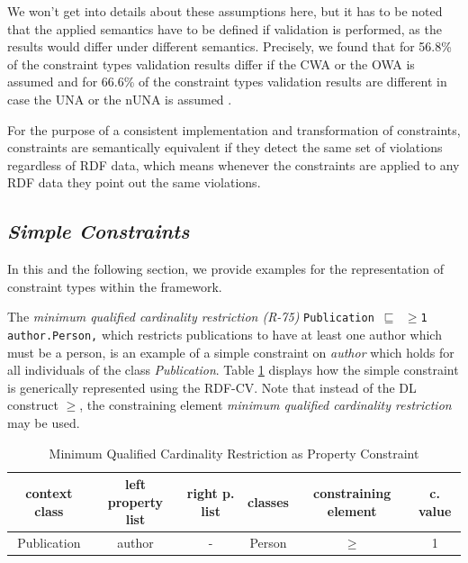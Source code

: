 \documentclass[a4paper,fontsize=11pt]{scrartcl}
\newcommand{\ms}[1]{\texttt{#1}}
\begin{document}
We won't get into details about these assumptions here, but it has to be noted that the applied semantics have to be defined if validation is performed, as the results would differ under different semantics. Precisely, we found that for 56.8\% of the constraint types validation results differ if the CWA or the OWA is assumed 
and for 66.6\% of the constraint types validation results are different in case the UNA or the nUNA is assumed \cite{BoschNolleAcarEckert2015}.

For the purpose of a consistent implementation and transformation of constraints, constraints are semantically equivalent  
if they detect the same set of violations regardless of RDF data, 
which means whenever the constraints are applied to any RDF data they point out the same violations.


\subsection{\emph{Simple Constraints}}
In this and the following section, we provide examples for the representation of constraint types within the framework.

The \emph{minimum qualified cardinality restriction (R-75)} {\small\ms{Publication $\sqsubseteq$ $\geq$1 author.Person,}}
which restricts publications to have at least one author which must be a person,
is an example of a simple constraint on \emph{author}
which holds for all individuals of the class \emph{Publication}.
Table \ref{tab:property-constraint-cardinality-restriction} displays how the simple constraint is generically represented using the RDF-CV. Note that instead of the DL construct $\geq$, the constraining element \emph{minimum qualified cardinality restriction} may be used.

\begin{table}[H]
  \scriptsize
  \sffamily
  \vspace{0cm}
	\caption{Minimum Qualified Cardinality Restriction as Property Constraint}
	\label{tab:property-constraint-cardinality-restriction}
	\centering
		\begin{tabular}{c|c|c|c|c|c}
      \textbf{context class} & \textbf{left property list} & \textbf{right p. list} & \textbf{classes} & \textbf{constraining element} & \textbf{c. value} \\
      \hline
      Publication & author & - & Person & $\geq$ & 1 \\
		\end{tabular}
\end{table}
\end{document}
